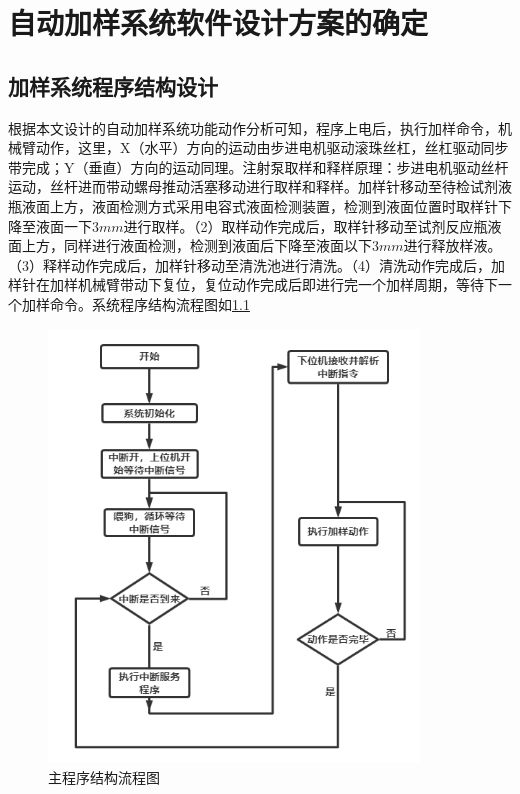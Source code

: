 \chapter{自动加样系统软件设计方案的确定}

\section{加样系统程序结构设计}
根据本文设计的自动加样系统功能动作分析可知，程序上电后，执行加样命令，机械臂动作，这里，X（水平）方向的运动由步进电机驱动滚珠丝杠，丝杠驱动同步带完成；Y（垂直）方向的运动同理。注射泵取样和释样原理：步进电机驱动丝杆运动，丝杆进而带动螺母推动活塞移动进行取样和释样。加样针移动至待检试剂液瓶液面上方，液面检测方式采用电容式液面检测装置，检测到液面位置时取样针下降至液面一下3$mm$进行取样。（2）取样动作完成后，取样针移动至试剂反应瓶液面上方，同样进行液面检测，检测到液面后下降至液面以下3$mm$进行释放样液。（3）释样动作完成后，加样针移动至清洗池进行清洗。（4）清洗动作完成后，加样针在加样机械臂带动下复位，复位动作完成后即进行完一个加样周期，等待下一个加样命令。系统程序结构流程图如\ref{fig:6-1}

\begin{figure}[htbp!]
	\centering
	\includegraphics[height=11.5cm]{chap/figure/6-1.jpg}
	\caption{主程序结构流程图}
	\label{fig:6-1}
\end{figure}